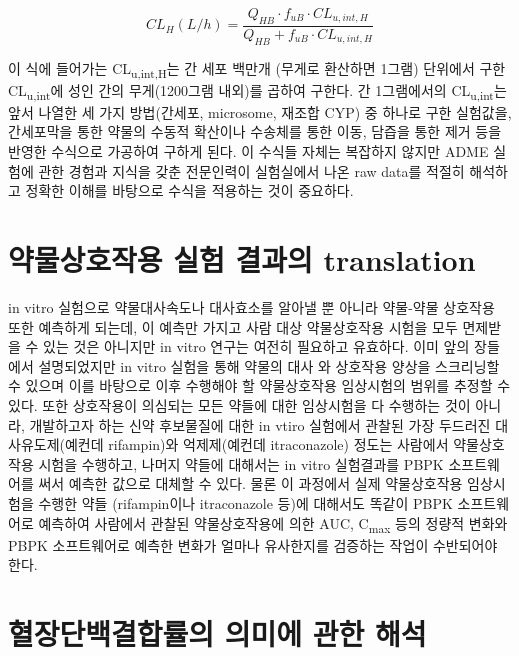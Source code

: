 \documentclass[
  11pt,
  krantz2, a4paper, twoside]{krantz}
\begin{document}
\begin{equation}
{CL}_{H}(L/h) = \frac{Q_{HB} \cdot f_{uB} \cdot {CL}_{u,int,H}}{Q_{HB} + f_{uB} \cdot {CL}_{u,int,H}}
\label{eq:eq08-01} 
\end{equation}

이 식에 들어가는 CL\textsubscript{u,int,H}는 간 세포 백만개 (무게로 환산하면 1그램)
단위에서 구한 CL\textsubscript{u,int}에 성인 간의 무게(1200그램 내외)를 곱하여 구한다.
간 1그램에서의 CL\textsubscript{u,int}는 앞서 나열한 세 가지 방법(간세포, microsome,
재조합 CYP) 중 하나로 구한 실험값을, 간세포막을 통한 약물의 수동적
확산이나 수송체를 통한 이동, 담즙을 통한 제거 등을 반영한 수식으로
가공하여 구하게 된다. 이 수식들 자체는 복잡하지 않지만 ADME 실험에 관한
경험과 지식을 갖춘 전문인력이 실험실에서 나온 raw data를 적절히 해석하고
정확한 이해를 바탕으로 수식을 적용하는 것이 중요하다.

\section{약물상호작용 실험 결과의 translation}\label{uxc57duxbb3cuxc0c1uxd638uxc791uxc6a9-uxc2e4uxd5d8-uxacb0uxacfcuxc758-translation}

in vitro 실험으로 약물대사속도나 대사효소를 알아낼 뿐 아니라 약물-약물
상호작용 또한 예측하게 되는데, 이 예측만 가지고 사람 대상 약물상호작용
시험을 모두 면제받을 수 있는 것은 아니지만 in vitro 연구는 여전히
필요하고 유효하다. 이미 앞의 장들에서 설명되었지만 in vitro 실험을 통해
약물의 대사 와 상호작용 양상을 스크리닝할 수 있으며 이를 바탕으로 이후
수행해야 할 약물상호작용 임상시험의 범위를 추정할 수 있다. 또한
상호작용이 의심되는 모든 약들에 대한 임상시험을 다 수행하는 것이 아니라,
개발하고자 하는 신약 후보물질에 대한 in vtiro 실험에서 관찰된 가장
두드러진 대사유도제(예컨데 rifampin)와 억제제(예컨데 itraconazole)
정도는 사람에서 약물상호작용 시험을 수행하고, 나머지 약들에 대해서는 in
vitro 실험결과를 PBPK 소프트웨어를 써서 예측한 값으로 대체할 수 있다.
물론 이 과정에서 실제 약물상호작용 임상시험을 수행한 약들 (rifampin이나
itraconazole 등)에 대해서도 똑같이 PBPK 소프트웨어로 예측하여 사람에서
관찰된 약물상호작용에 의한 AUC, C\textsubscript{max} 등의 정량적 변화와 PBPK
소프트웨어로 예측한 변화가 얼마나 유사한지를 검증하는 작업이 수반되어야
한다.

\section{혈장단백결합률의 의미에 관한 해석}\label{uxd608uxc7a5uxb2e8uxbc31uxacb0uxd569uxb960uxc758-uxc758uxbbf8uxc5d0-uxad00uxd55c-uxd574uxc11d}
\end{document}

